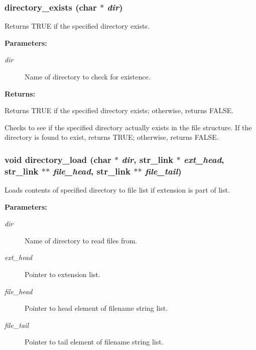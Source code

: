 \subsubsection{ directory\_\-exists (char $\ast$ {\em dir})}\label{util_8h_a5}


Returns TRUE if the specified directory exists.

\begin{Desc}
\item[{\bf Parameters: }]\par
\begin{description}
\item[
{\em dir}]Name of directory to check for existence. \end{description}
\end{Desc}
\begin{Desc}
\item[{\bf Returns: }]\par
Returns TRUE if the specified directory exists; otherwise, returns FALSE.

\end{Desc}
Checks to see if the specified directory actually exists in the file structure. If the directory is found to exist, returns TRUE; otherwise, returns FALSE. 
\subsubsection{\setlength{\rightskip}{0pt plus 5cm}void directory\_\-load (char $\ast$ {\em dir}, {\bf str\_\-link} $\ast$ {\em ext\_\-head}, {\bf str\_\-link} $\ast$$\ast$ {\em file\_\-head}, {\bf str\_\-link} $\ast$$\ast$ {\em file\_\-tail})}\label{util_8h_a6}


Loads contents of specified directory to file list if extension is part of list.

\begin{Desc}
\item[{\bf Parameters: }]\par
\begin{description}
\item[
{\em dir}]Name of directory to read files from. \item[
{\em ext\_\-head}]Pointer to extension list. \item[
{\em file\_\-head}]Pointer to head element of filename string list. \item[
{\em file\_\-tail}]Pointer to tail element of filename string list.

\end{description}
\end{Desc}


